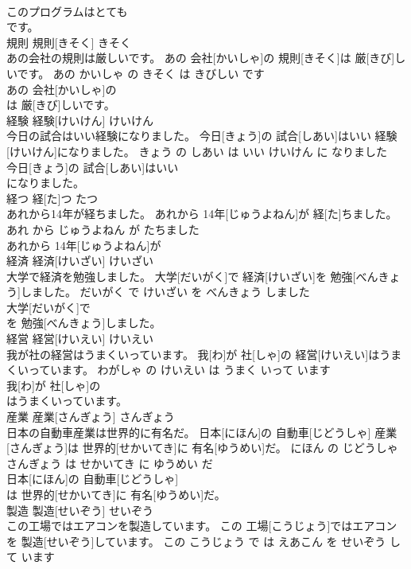 \documentclass[8pt]{extreport}
\begin{document}
\begin{CJK}{UTF8}{min}
\\	このプログラムはとても
\\	です。			
\\	規則	規則[きそく]	きそく	
\\	あの会社の規則は厳しいです。	あの 会社[かいしゃ]の 規則[きそく]は 厳[きび]しいです。	あの かいしゃ の きそく は きびしい です	
\\	あの 会社[かいしゃ]の
\\	は 厳[きび]しいです。			
\\	経験	経験[けいけん]	けいけん	
\\	今日の試合はいい経験になりました。	今日[きょう]の 試合[しあい]はいい 経験[けいけん]になりました。	きょう の しあい は いい けいけん に なりました	
\\	今日[きょう]の 試合[しあい]はいい
\\	になりました。			
\\	経つ	経[た]つ	たつ	
\\	あれから14年が経ちました。	あれから 14年[じゅうよねん]が 経[た]ちました。	あれ から じゅうよねん が たちました	
\\	あれから 14年[じゅうよねん]が
\\	経済	経済[けいざい]	けいざい	
\\	大学で経済を勉強しました。	大学[だいがく]で 経済[けいざい]を 勉強[べんきょう]しました。	だいがく で けいざい を べんきょう しました	
\\	大学[だいがく]で
\\	を 勉強[べんきょう]しました。			
\\	経営	経営[けいえい]	けいえい	
\\	我が社の経営はうまくいっています。	我[わ]が 社[しゃ]の 経営[けいえい]はうまくいっています。	わがしゃ の けいえい は うまく いって います	
\\	我[わ]が 社[しゃ]の
\\	はうまくいっています。			
\\	産業	産業[さんぎょう]	さんぎょう	
\\	日本の自動車産業は世界的に有名だ。	日本[にほん]の 自動車[じどうしゃ] 産業[さんぎょう]は 世界的[せかいてき]に 有名[ゆうめい]だ。	にほん の じどうしゃ さんぎょう は せかいてき に ゆうめい だ	
\\	日本[にほん]の 自動車[じどうしゃ]
\\	は 世界的[せかいてき]に 有名[ゆうめい]だ。			
\\	製造	製造[せいぞう]	せいぞう	
\\	この工場ではエアコンを製造しています。	この 工場[こうじょう]ではエアコンを 製造[せいぞう]しています。	この こうじょう で は えあこん を せいぞう して います	

\end{CJK}
\end{document}

